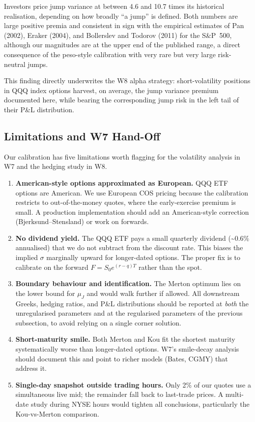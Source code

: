 \documentclass[12pt]{article}
\begin{document}
Investors price jump variance at between 4.6 and 10.7 times its
historical realisation, depending on how broadly ``a jump'' is defined.
Both numbers are large positive premia and consistent in sign with the
empirical estimates of Pan (2002), Eraker (2004), and Bollerslev and
Todorov (2011) for the S\&P~500, although our magnitudes are at the
upper end of the published range, a direct consequence of the
peso-style calibration with very rare but very large risk-neutral
jumps.

This finding directly underwrites the W8 alpha strategy:
short-volatility positions in QQQ index options harvest, on average,
the jump variance premium documented here, while bearing the
corresponding jump risk in the left tail of their P\&L distribution.


\subsection*{Limitations and W7 Hand-Off}

Our calibration has five limitations worth flagging for the volatility
analysis in W7 and the hedging study in W8.

\begin{enumerate}[leftmargin=*]
   \item \textbf{American-style options approximated as European.}
   QQQ ETF options are American. We use European COS pricing because
   the calibration restricts to out-of-the-money quotes, where the
   early-exercise premium is small. A production implementation
   should add an American-style correction (Bjerksund--Stensland) or
   work on forwards.

   \item \textbf{No dividend yield.} The QQQ ETF pays a small
   quarterly dividend (\textasciitilde$0.6\%$ annualised) that we do
   not subtract from the discount rate. This biases the implied
   $\sigma$ marginally upward for longer-dated options. The proper
   fix is to calibrate on the forward $F = S_0 e^{(r-q)T}$ rather
   than the spot.

   \item \textbf{Boundary behaviour and identification.} The Merton
   optimum lies on the lower bound for $\mu_J$ and would walk further
   if allowed. All downstream Greeks, hedging ratios, and P\&L
   distributions should be reported at \emph{both} the unregularised
   parameters and at the regularised parameters of the previous
   subsection, to avoid relying on a single corner solution.

   \item \textbf{Short-maturity smile.} Both Merton and Kou fit the
   shortest maturity systematically worse than longer-dated options.
   W7's smile-decay analysis should document this and point to richer
   models (Bates, CGMY) that address it.

   \item \textbf{Single-day snapshot outside trading hours.} Only 2\%
   of our quotes use a simultaneous live mid; the remainder fall back
   to last-trade prices. A multi-date study during NYSE hours would
   tighten all conclusions, particularly the Kou-vs-Merton comparison.
\end{enumerate}
\end{document}
